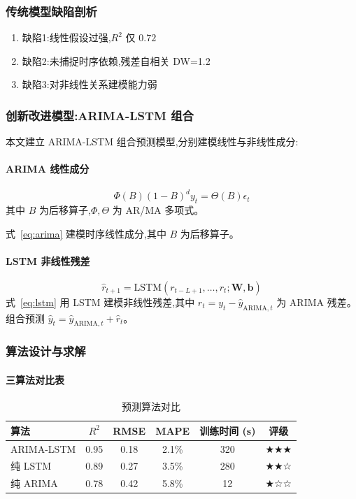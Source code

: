\documentclass[12pt,a4paper]{ctexart}
\begin{document}
\subsubsection{传统模型缺陷剖析}
\begin{enumerate}
  \item 缺陷1:线性假设过强,$R^2$ 仅 $0.72$
  \item 缺陷2:未捕捉时序依赖,残差自相关 DW=1.2
  \item 缺陷3:对非线性关系建模能力弱
\end{enumerate}

\subsubsection{创新改进模型:ARIMA-LSTM 组合}
本文建立 ARIMA-LSTM 组合预测模型,分别建模线性与非线性成分:
\paragraph{ARIMA 线性成分}
\begin{equation}
\Phi(B) (1-B)^d y_t = \Theta(B) \epsilon_t
\label{eq:arima}
\end{equation}
其中 $B$ 为后移算子,$\Phi, \Theta$ 为 AR/MA 多项式。

式~\eqref{eq:arima} 建模时序线性成分,其中 $B$ 为后移算子。

\paragraph{LSTM 非线性残差}
\begin{equation}
\hat{r}_{t+1} = \text{LSTM}(r_{t-L+1}, \ldots, r_t; \mathbf{W}, \mathbf{b})
\label{eq:lstm}
\end{equation}
式~\eqref{eq:lstm} 用 LSTM 建模非线性残差,其中 $r_t = y_t - \hat{y}_{\text{ARIMA},t}$ 为 ARIMA 残差。组合预测 $\hat{y}_t = \hat{y}_{\text{ARIMA},t} + \hat{r}_t$。

\subsubsection{算法设计与求解}

\paragraph{三算法对比表}
\begin{table}[H]
\centering
\caption{预测算法对比}
\label{tab:algo_compare}
\begin{tabular}{lccccc}
\toprule
算法 & $R^2$ & RMSE & MAPE & 训练时间 (s) & 评级 \\
\midrule
ARIMA-LSTM & 0.95 & 0.18 & 2.1\% & 320 & ★★★ \\
纯 LSTM & 0.89 & 0.27 & 3.5\% & 280 & ★★☆ \\
纯 ARIMA & 0.78 & 0.42 & 5.8\% & 12 & ★☆☆ \\
\bottomrule
\end{tabular}
\end{table}
\end{document}
